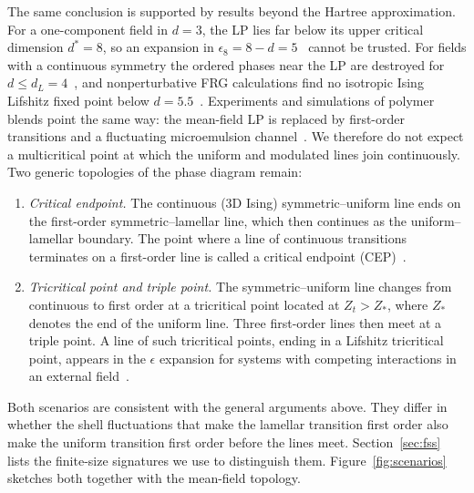 \documentclass[aps,prd,twocolumn,superscriptaddress,nofootinbib,10pt]{revtex4-2}
\begin{document}
The same conclusion is supported by results beyond the Hartree
approximation.  For a one-component field in $d=3$, the LP lies far below its
upper critical dimension $d^*=8$, so an expansion in
$\epsilon_8=8-d=5$~\cite{Diehl2002,Diehl2002b} cannot be trusted.  For fields
with a continuous symmetry the ordered phases near the LP are destroyed for
$d\le d_L=4$~\cite{Diehl2002,Zappala2018}, and nonperturbative FRG
calculations find no isotropic Ising Lifshitz fixed point below
$d=5.5$~\cite{Bonanno2015}.  Experiments and simulations of polymer blends
point the same way: the mean-field LP is replaced by first-order transitions
and a fluctuating microemulsion channel~\cite{Bates1995,Bates1997,
Kielhorn1997,Duchs2003}.  We therefore do not expect a multicritical point at
which the uniform and modulated lines join continuously.  Two generic
topologies of the phase diagram remain:
\begin{enumerate}
 \item[(a)] \emph{Critical endpoint.}  The continuous (3D Ising)
 symmetric--uniform line ends on the first-order symmetric--lamellar line,
 which then continues as the uniform--lamellar boundary.  The point where a
 line of continuous transitions terminates on a first-order line is called a
 critical endpoint (CEP)~\cite{Fisher1990,Fisher1991}.
 \item[(b)] \emph{Tricritical point and triple point.}  The
 symmetric--uniform line changes from continuous to first order at a
 tricritical point located at $Z_t>Z_*$, where $Z_*$ denotes the end of the
 uniform line.  Three first-order lines then meet at a triple point.  A line
 of such tricritical points, ending in a Lifshitz tricritical point, appears
 in the $\epsilon$ expansion for systems with competing interactions in an
 external field~\cite{Barbosa1993}.
\end{enumerate}
Both scenarios are consistent with the general arguments above.  They differ
in whether the shell fluctuations that make the lamellar transition first
order also make the uniform transition first order before the lines meet.
Section~\ref{sec:fss} lists the finite-size signatures we use to distinguish
them.  Figure~\ref{fig:scenarios} sketches both together with the
mean-field topology.
\end{document}
